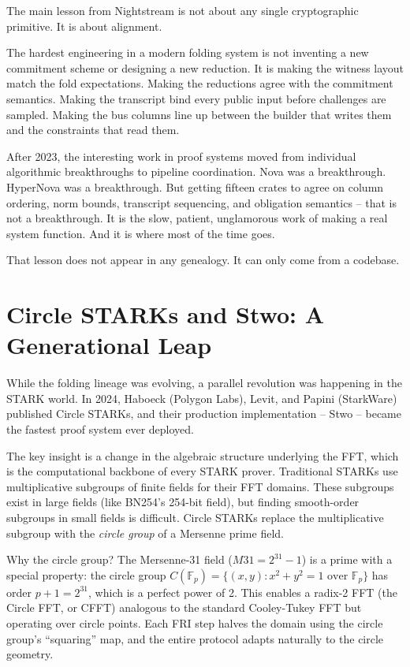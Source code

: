 \documentclass[
  11pt,
  openany]{report}
\begin{document}
The main lesson from Nightstream is not about any single cryptographic
primitive. It is about alignment.

The hardest engineering in a modern folding system is not inventing a new
commitment scheme or designing a new reduction. It is making the witness layout
match the fold expectations. Making the reductions agree with the commitment
semantics. Making the transcript bind every public input before challenges are
sampled. Making the bus columns line up between the builder that writes them and
the constraints that read them.

After 2023, the interesting work in proof systems moved from individual
algorithmic breakthroughs to pipeline coordination. Nova was a breakthrough.
HyperNova was a breakthrough. But getting fifteen crates to agree on column
ordering, norm bounds, transcript sequencing, and obligation semantics -- that
is not a breakthrough. It is the slow, patient, unglamorous work of making a
real system function. And it is where most of the time goes.

That lesson does not appear in any genealogy. It can only come from a codebase.

\section{Circle STARKs and Stwo: A Generational
Leap}\label{circle-starks-and-stwo-a-generational-leap}

While the folding lineage was evolving, a parallel revolution was happening in
the STARK world. In 2024, Haboeck (Polygon Labs), Levit, and Papini (StarkWare)
published Circle STARKs, and their production implementation -- Stwo -- became
the fastest proof system ever deployed.

The key insight is a change in the algebraic structure underlying the FFT, which
is the computational backbone of every STARK prover. Traditional STARKs use
multiplicative subgroups of finite fields for their FFT domains. These subgroups
exist in large fields (like BN254's 254-bit field), but finding smooth-order
subgroups in small fields is difficult. Circle STARKs replace the multiplicative
subgroup with the \emph{circle group} of a Mersenne prime field.

Why the circle group? The Mersenne-31 field (\(M31 = 2^{31} - 1\)) is a prime
with a special property: the circle group
\(C(\mathbb{F}_p) = \{(x, y) : x^2 + y^2 = 1 \text{ over } \mathbb{F}_p\}\) has
order \(p + 1 = 2^{31}\), which is a perfect power of 2. This enables a radix-2
FFT (the Circle FFT, or CFFT) analogous to the standard Cooley-Tukey FFT but
operating over circle points. Each FRI step halves the domain using the circle
group's ``squaring'' map, and the entire protocol adapts naturally to the circle
geometry.
\end{document}
